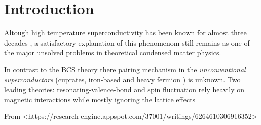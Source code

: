 \chapter{Introduction}
\label{chap:introduction}

Altough high temperature superconductivity has been known for almost three decades \cite{Bednorz1986}, a satisfactory explanation of this phenomenom still remains as one of the major unsolved problems in theoretical condensed matter physics. 

In contrast to the BCS theory \cite{?} there pairing mechanism in the \textit{unconventional superconductors} (cuprates, iron-based and heavy fermion \cite{Pfleiderer2009}) is unknown.
Two leading theories: resonating-valence-bond \cite{?} and spin fluctuation \cite{Scalapino2012} rely heavily on magnetic interactions while mostly ignoring the lattice effects


From <https://research-engine.appspot.com/37001/writings/6264610306916352>

